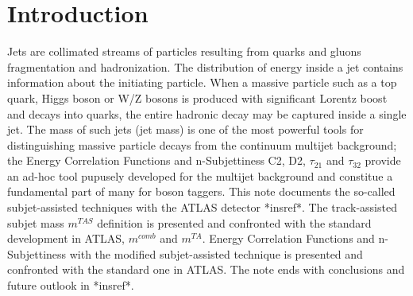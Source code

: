 \documentclass[UKenglish,texlive=2013]{\ATLASLATEXPATH atlasdoc}
\begin{document}
\maketitle

\tableofcontents


\section{Introduction}
\label{sec:intro}



Jets are collimated streams of particles resulting from quarks and gluons fragmentation and hadronization.
The distribution of energy inside a jet contains information about the initiating particle. When a massive
particle such as a top quark, Higgs boson or W/Z bosons is produced with significant Lorentz boost and decays into
quarks, the entire hadronic decay may be captured inside a single jet. The mass of such jets (jet mass)
is one of the most powerful tools for distinguishing massive particle decays from the continuum multijet
background; the Energy Correlation Functions and n-Subjettiness C2, D2, $\tau_{21}$ and $\tau_{32}$ provide an ad-hoc tool pupusely developed for the multijet background and constitue a fundamental part of many for boson taggers.
This note documents the so-called subjet-assisted techniques with the ATLAS detector *insref*. 
The track-assisted subjet mass $m^{TAS}$ definition is presented and confronted with the standard development in ATLAS, $m^{comb}$ and $m^{TA}$. 
Energy Correlation Functions and n-Subjettiness with the modified subjet-assisted technique is presented and confronted with the standard one in ATLAS.
The note ends with conclusions and future outlook in *insref*.


\end{document}
